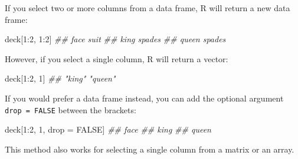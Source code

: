\documentclass[
  letterpaper,
  DIV=11,
  numbers=noendperiod]{scrbook}
\newenvironment{Shaded}{\begin{snugshade}}{\end{snugshade}}
\newcommand{\ConstantTok}[1]{\textcolor[rgb]{0.56,0.35,0.01}{#1}}
\newcommand{\DecValTok}[1]{\textcolor[rgb]{0.68,0.00,0.00}{#1}}
\newcommand{\DocumentationTok}[1]{\textcolor[rgb]{0.37,0.37,0.37}{\textit{#1}}}
\newcommand{\NormalTok}[1]{\textcolor[rgb]{0.00,0.23,0.31}{#1}}
\newcommand{\OtherTok}[1]{\textcolor[rgb]{0.00,0.23,0.31}{#1}}
\newcommand{\SpecialCharTok}[1]{\textcolor[rgb]{0.37,0.37,0.37}{#1}}
\begin{document}
\begin{tcolorbox}[enhanced jigsaw, breakable, colback=white, colbacktitle=quarto-callout-tip-color!10!white, arc=.35mm, bottomrule=.15mm, coltitle=black, left=2mm, rightrule=.15mm, colframe=quarto-callout-tip-color-frame, leftrule=.75mm, opacitybacktitle=0.6, bottomtitle=1mm, toptitle=1mm, titlerule=0mm, opacityback=0, title=\textcolor{quarto-callout-tip-color}{\faLightbulb}\hspace{0.5em}{\texttt{drop\ =\ FALSE}}, toprule=.15mm]

If you select two or more columns from a data frame, R will return a new
data frame:

\begin{Shaded}
\begin{Highlighting}[]
\NormalTok{deck[}\DecValTok{1}\SpecialCharTok{:}\DecValTok{2}\NormalTok{, }\DecValTok{1}\SpecialCharTok{:}\DecValTok{2}\NormalTok{]}
\DocumentationTok{\#\#  face   suit}
\DocumentationTok{\#\#  king spades}
\DocumentationTok{\#\# queen spades}
\end{Highlighting}
\end{Shaded}

However, if you select a single column, R will return a vector:

\begin{Shaded}
\begin{Highlighting}[]
\NormalTok{deck[}\DecValTok{1}\SpecialCharTok{:}\DecValTok{2}\NormalTok{, }\DecValTok{1}\NormalTok{]}
\DocumentationTok{\#\#  "king"  "queen"}
\end{Highlighting}
\end{Shaded}

If you would prefer a data frame instead, you can add the optional
argument \texttt{drop\ =\ FALSE} between the brackets:

\begin{Shaded}
\begin{Highlighting}[]
\NormalTok{deck[}\DecValTok{1}\SpecialCharTok{:}\DecValTok{2}\NormalTok{, }\DecValTok{1}\NormalTok{, drop }\OtherTok{=} \ConstantTok{FALSE}\NormalTok{]}
\DocumentationTok{\#\#  face}
\DocumentationTok{\#\#  king}
\DocumentationTok{\#\# queen}
\end{Highlighting}
\end{Shaded}

This method also works for selecting a single column from a matrix or an
array.

\end{tcolorbox}
\end{document}
